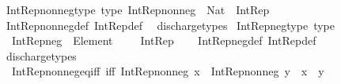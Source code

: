 \begin{isabellebody}
\isanewline
{}\isamarkupfalse%
\ Int{\isacharunderscore}{\kern0pt}Rep{\isacharunderscore}{\kern0pt}nonneg{\isacharunderscore}{\kern0pt}type\ {\isacharbrackleft}{\kern0pt}type{\isacharbrackright}{\kern0pt}{\isacharcolon}{\kern0pt}\ {\isachardoublequoteopen}Int{\isacharunderscore}{\kern0pt}Rep{\isacharunderscore}{\kern0pt}nonneg\ {\isacharcolon}{\kern0pt}\ Nat\ {\isasymRightarrow}\ Int{\isacharunderscore}{\kern0pt}Rep{\isachardoublequoteclose}\isanewline
%
\isadelimproof
\ \ %
\endisadelimproof
%
\isatagproof
{}\isamarkupfalse%
\ Int{\isacharunderscore}{\kern0pt}Rep{\isacharunderscore}{\kern0pt}nonneg{\isacharunderscore}{\kern0pt}def\ Int{\isacharunderscore}{\kern0pt}Rep{\isacharunderscore}{\kern0pt}def\ \isamarkupfalse%
\ discharge{\isacharunderscore}{\kern0pt}types%
\endisatagproof
{\isafoldproof}%
%
\isadelimproof
\isanewline
%
\endisadelimproof
\isanewline
{}\isamarkupfalse%
\ Int{\isacharunderscore}{\kern0pt}Rep{\isacharunderscore}{\kern0pt}neg{\isacharunderscore}{\kern0pt}type\ {\isacharbrackleft}{\kern0pt}type{\isacharbrackright}{\kern0pt}{\isacharcolon}{\kern0pt}\isanewline
\ \ {\isachardoublequoteopen}Int{\isacharunderscore}{\kern0pt}Rep{\isacharunderscore}{\kern0pt}neg\ {\isacharcolon}{\kern0pt}\ Element\ {\isacharparenleft}{\kern0pt}{\isasymnat}\ {\isasymsetminus}\ {\isacharbraceleft}{\kern0pt}{}{\isacharbraceright}{\kern0pt}{\isacharparenright}{\kern0pt}\ {\isasymRightarrow}\ Int{\isacharunderscore}{\kern0pt}Rep{\isachardoublequoteclose}\isanewline
%
\isadelimproof
\ \ %
\endisadelimproof
%
\isatagproof
{}\isamarkupfalse%
\ Int{\isacharunderscore}{\kern0pt}Rep{\isacharunderscore}{\kern0pt}neg{\isacharunderscore}{\kern0pt}def\ Int{\isacharunderscore}{\kern0pt}Rep{\isacharunderscore}{\kern0pt}def\ \isamarkupfalse%
\ discharge{\isacharunderscore}{\kern0pt}types%
\endisatagproof
{\isafoldproof}%
%
\isadelimproof
\isanewline
%
\endisadelimproof
\isanewline
{}\isamarkupfalse%
\isanewline
\ \ Int{\isacharunderscore}{\kern0pt}Rep{\isacharunderscore}{\kern0pt}nonneg{\isacharunderscore}{\kern0pt}eq{\isacharunderscore}{\kern0pt}iff\ {\isacharbrackleft}{\kern0pt}iff{\isacharbrackright}{\kern0pt}{\isacharcolon}{\kern0pt}\ {\isachardoublequoteopen}Int{\isacharunderscore}{\kern0pt}Rep{\isacharunderscore}{\kern0pt}nonneg\ x\ {\isacharequal}{\kern0pt}\ Int{\isacharunderscore}{\kern0pt}Rep{\isacharunderscore}{\kern0pt}nonneg\ y\ {\isasymlongleftrightarrow}\ x\ {\isacharequal}{\kern0pt}\ y{\isachardoublequoteclose}\ \isanewline

\end{isabellebody}
